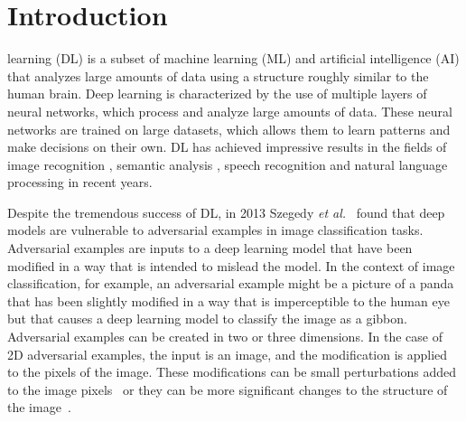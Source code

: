 \documentclass{ieeeaccess}
\def\etal{\textit{et al.}}
\begin{document}
\endgroup
\section{Introduction}
\label{sec:introduction}

 learning (DL) \cite{lecun2015deep} is a subset of machine learning (ML) and artificial intelligence (AI) that analyzes large amounts of data %
using a structure roughly similar to the human brain. Deep learning is characterized by the use of multiple layers of neural networks, which process and analyze large amounts of data. These neural networks are trained on large datasets, which allows them to learn patterns and make decisions on their own. DL has achieved impressive results in the fields of image recognition \cite{li2022research,krizhevsky2017imagenet,naderi2020scale}, semantic analysis \cite{silberman2011indoor,mo2022review}, speech recognition \cite{nassif2019speech,taher2021deep} and natural language processing \cite{chowdhary2020natural} in recent years. 



Despite the tremendous success of DL, in 2013 Szegedy \etal~\cite{szegedy2014intriguing} found that deep models are vulnerable to adversarial examples in image classification tasks. Adversarial examples are inputs to a deep learning model that have been modified in a way that is intended to mislead the model. In the context of image classification, for example, an adversarial example might be a picture of a panda that has been slightly modified in a way that is imperceptible to the human eye but that causes a deep learning model to classify the image as a gibbon. Adversarial examples can be created in two or three dimensions. In the case of 2D adversarial examples, the input is an image, and the modification is applied to the pixels of the image. These modifications can be small perturbations added to the image pixels~\cite{moosavi2016deepfool} or they can be more significant changes to the structure of the image~\cite{eykholt2018robust}.
\end{document}
